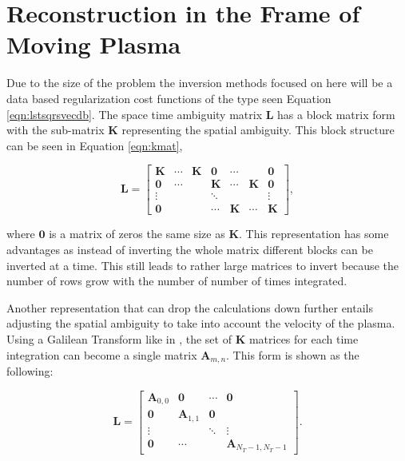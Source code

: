 \section{Reconstruction in the Frame of Moving Plasma}
\label{sec:isralg}
Due to the size of the problem the inversion methods focused on here will be a data based regularization cost functions of the type seen Equation \ref{eqn:lstsqrsvecdb}. The space time ambiguity matrix $\mathbf{L}$ has a block matrix form with the sub-matrix $\mathbf{K}$ representing the spatial ambiguity. This block structure can be seen in Equation \ref{eqn:kmat},

\begin{equation}
\label{eqn:kmat}
\mathbf{L}= \begin{bmatrix}\mathbf{K}&\cdots&\mathbf{K}&\mathbf{0}&\cdots&&\mathbf{0}\\
\mathbf{0}&\cdots&&\mathbf{K}&\cdots&\mathbf{K}&\mathbf{0}\\
\vdots&&&\ddots&&&\vdots\\
\mathbf{0}&&&\cdots&\mathbf{K}&\cdots&\mathbf{K}
\end{bmatrix},
\end{equation}

\noindent where $\mathbf{0}$ is a matrix of zeros the same size as $\mathbf{K}$. This representation has some advantages as instead of inverting the whole matrix different blocks can be inverted at a time. This still leads to rather large matrices to invert because the number of rows grow with the number of number of times integrated. 

Another representation that can drop the calculations down further entails adjusting the spatial ambiguity to take into account the velocity of the plasma. Using a Galilean Transform like in \citet{RDS:RDS20236}, the set of $\mathbf{K}$ matrices for each time integration can become a single matrix $\mathbf{A}_{m,n}$. This form is shown as the following:

\begin{equation}
\label{eqn:amat}
\mathbf{L}= \begin{bmatrix}
\mathbf{A}_{0,0}&\mathbf{0}&\cdots&\mathbf{0}\\
 \mathbf{0}&\mathbf{A}_{1,1}&\mathbf{0}&\\
 \vdots&&\ddots&\vdots\\
 \mathbf{0}&\cdots&&\mathbf{A}_{N_T-1,N_T-1}
\end{bmatrix}.
\end{equation}


